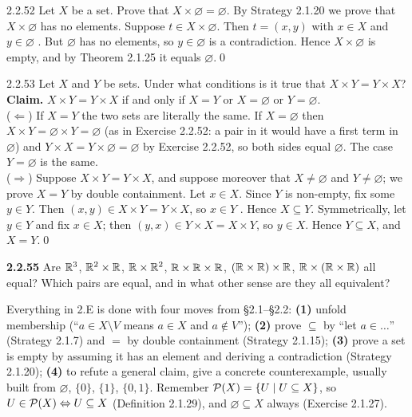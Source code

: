 \begin{bookex}{2.2.52}
Let $X$ be a set. Prove that $X\times\varnothing=\varnothing$.
\solution
By Strategy 2.1.20 we prove that $X\times\varnothing$ has no elements. Suppose $t\in X\times\varnothing$. Then $t=(x,y)$ with $x\in X$ and $y\in\varnothing$ . But $\varnothing$ has no elements, so $y\in\varnothing$ is a contradiction. Hence $X\times\varnothing$ is empty, and by Theorem 2.1.25 it equals $\varnothing$.\qed
\end{bookex}

\begin{bookex}[recommended]{2.2.53}
Let $X$ and $Y$ be sets. Under what conditions is it true that $X\times Y=Y\times X$?
\solution
\textbf{Claim.} $X\times Y=Y\times X$ if and only if $X=Y$ or $X=\varnothing$ or $Y=\varnothing$.\\
($\Leftarrow$) If $X=Y$ the two sets are literally the same. If $X=\varnothing$ then $X\times Y=\varnothing\times Y=\varnothing$ (as in Exercise 2.2.52: a pair in it would have a first term in $\varnothing$) and $Y\times X=Y\times\varnothing=\varnothing$ by Exercise 2.2.52, so both sides equal $\varnothing$. The case $Y=\varnothing$ is the same.\\
($\Rightarrow$) Suppose $X\times Y=Y\times X$, and suppose moreover that $X\ne\varnothing$ and $Y\ne\varnothing$; we prove $X=Y$ by double containment. Let $x\in X$. Since $Y$ is non-empty, fix some $y\in Y$. Then $(x,y)\in X\times Y=Y\times X$, so $x\in Y$ . Hence $X\subseteq Y$. Symmetrically, let $y\in Y$ and fix $x\in X$; then $(y,x)\in Y\times X=X\times Y$, so $y\in X$. Hence $Y\subseteq X$, and $X=Y$.\qed
\end{bookex}

\begin{trybox}[{2.2.55 \fO}]
\textbf{2.2.55} Are $\mathbb{R}^3$, $\mathbb{R}^2\times\mathbb{R}$, $\mathbb{R}\times\mathbb{R}^2$, $\mathbb{R}\times\mathbb{R}\times\mathbb{R}$, $(\mathbb{R}\times\mathbb{R})\times\mathbb{R}$, $\mathbb{R}\times(\mathbb{R}\times\mathbb{R})$ all equal? Which pairs are equal, and in what other sense are they all equivalent? 
\end{trybox}


\begin{strategy}
Everything in 2.E is done with four moves from \S2.1--\S2.2: \textbf{(1)} unfold membership (``$a\in X\setminus V$ means $a\in X$ and $a\notin V$''); \textbf{(2)} prove $\subseteq$ by ``let $a\in\dots$'' (Strategy 2.1.7) and $=$ by double containment (Strategy 2.1.15); \textbf{(3)} prove a set is empty by assuming it has an element and deriving a contradiction (Strategy 2.1.20); \textbf{(4)} to refute a general claim, give a concrete counterexample, usually built from $\varnothing$, $\{0\}$, $\{1\}$, $\{0,1\}$. Remember $\mathcal{P}(X)=\{U\mid U\subseteq X\}$, so $U\in\mathcal{P}(X)\Leftrightarrow U\subseteq X$ (Definition 2.1.29), and $\varnothing\subseteq X$ always (Exercise 2.1.27).
\end{strategy}

